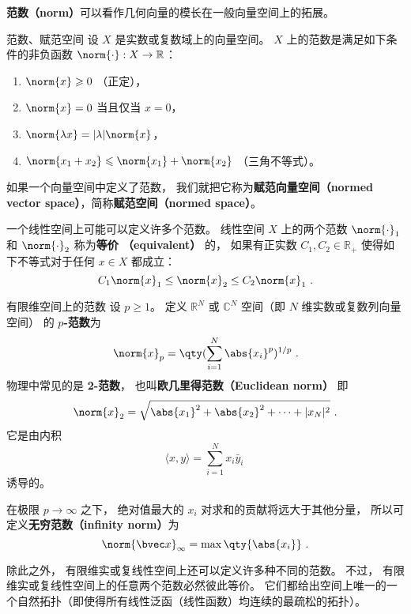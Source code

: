 

\textbf{范数（norm）}可以看作几何向量的模长在一般向量空间上的拓展。
\begin{definition}{范数、赋范空间}\label{def_NormV_1}
设 $X$ 是实数或复数域上的向量空间。 $X$ 上的范数是满足如下条件的非负函数 $\norm{\cdot}: X \to \mathbb{R}$：
\begin{enumerate}
\item $\norm{x} \geqslant 0$ （正定），
\item $\norm{x} = 0$ 当且仅当 $x = 0$，
\item $\norm{\lambda x} = |\lambda|\norm{x}$，
\item $\norm{x_1+x_2} \leqslant \norm{x_1} + \norm{x_2}$ （三角不等式）。
\end{enumerate}
如果一个向量空间中定义了范数， 我们就把它称为\textbf{赋范向量空间（normed vector space）}，简称\textbf{赋范空间（normed space）}。
\end{definition}

一个线性空间上可能可以定义许多个范数。 线性空间 $X$ 上的两个范数 $\norm{\cdot}_1$ 和 $\norm{\cdot}_2$ 称为\textbf{等价 （equivalent）} 的， 如果有正实数 $C_1, C_2 \in \mathbb{R}_+$ 使得如下不等式对于任何 $x\in X$ 都成立：
$$
C_1 \norm{x}_{1} \leq \norm{x}_2 \leq C_2 \norm{x}_1~.
$$

\begin{example}{有限维空间上的范数}
设 $p\geq 1$。 定义 $\mathbb R^N$ 或 $\mathbb C^N$ 空间（即 $N$ 维实数或复数列向量空间） 的 \textbf{$p$-范数}为
\begin{equation}
\norm{ x}_p = \qty(\sum_{i=1}^N \abs{x_i}^p)^{1/p}~.
\end{equation}
物理中常见的是 \textbf{2-范数}， 也叫\textbf{欧几里得范数（Euclidean norm）} 即
\begin{equation}
\norm{ x}_2 = \sqrt{\abs{x_1}^2 + \abs{x_2}^2 + \dots+|x_N|^2}~.
\end{equation}
它是由内积
$$
\langle x,y\rangle=\sum_{i=1}^Nx_i\bar y_i~
$$
诱导的。

在极限 $p \to \infty$ 之下， 绝对值最大的 $x_i$ 对求和的贡献将远大于其他分量， 所以可定义\textbf{无穷范数（infinity norm）}为
\begin{equation}
\norm{\bvec x}_\infty = \max \qty{\abs{x_i}}~.
\end{equation}

除此之外， 有限维实或复线性空间上还可以定义许多种不同的范数。 不过， 有限维实或复线性空间上的任意两个范数必然彼此等价。 它们都给出空间上唯一的一个自然拓扑（即使得所有线性泛函（线性函数）均连续的最疏松的拓扑）。

\end{example}

